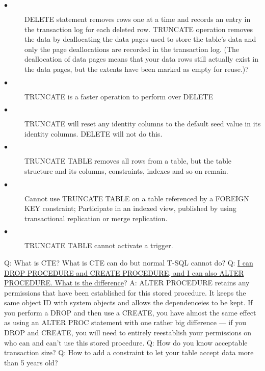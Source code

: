 \documentclass[a4paper,11pt]{article}
\begin{document}
\begin{description}
  \item[$\bullet$] DELETE statement removes rows one at a time and records an entry in the transaction log for each deleted row. TRUNCATE operation removes the data by deallocating the data pages used to store the table’s data and only the page deallocations are recorded in the transaction log. (The deallocation of data pages means that your data rows still actually exist in the data pages, but the extents have been marked as empty for reuse.)?
  \item[$\bullet$] TRUNCATE  is a faster operation to perform over DELETE
  \item[$\bullet$] TRUNCATE will reset any identity columns to the default seed value in its identity columns. DELETE will not do this.
  \item[$\bullet$] TRUNCATE TABLE removes all rows from a table, but the table structure and its columns, constraints, indexes and so on remain. 
  \item[$\bullet$] Cannot use TRUNCATE TABLE on a table referenced by a FOREIGN KEY constraint; Participate in an indexed view, published by using transactional replication or merge replication. 
  \item[$\bullet$] TRUNCATE TABLE cannot activate a trigger. 
\end{description}
\noindent 
\newline
Q: What is CTE? What is CTE can do but normal T-SQL cannot do?\newline \newline
\noindent 
Q: \ul{I can DROP PROCEDURE and CREATE PROCEDURE, and I can also ALTER PROCEDURE. What is the difference}? \newline 
A: ALTER PROCEDURE retains any permissions that have been established for this stored procedure. It keeps the same object ID with system objects and allows the dependenceies to be kept. If you perform a DROP and then use a CREATE, you have almost the same effect as using an ALTER PROC statement with one rather big difference — if you DROP and CREATE, you will need to entirely reestablish your permissions on who can and can’t use this stored procedure.\newline\newline
\noindent 
Q: How do you know acceptable transaction size? \newline \newline
\noindent 
Q: How to add a constraint to let your table accept data more than 5 years old? \newline \newline
\end{document}
